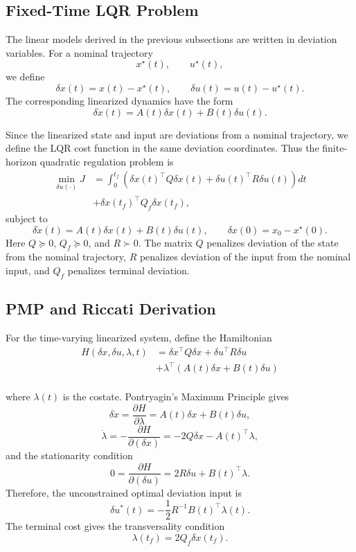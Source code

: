 
\subsection{Fixed-Time LQR Problem}

The linear models derived in the previous subsections are written in deviation variables. For a nominal trajectory
\[
    x^\star(t), \qquad u^\star(t),
\]
we define
\[
    \delta x(t)=x(t)-x^\star(t),
    \qquad
    \delta u(t)=u(t)-u^\star(t).
\]
The corresponding linearized dynamics have the form
\[
    \delta \dot x(t)
    =
    A(t)\delta x(t)+B(t)\delta u(t).
\]


Since the linearized state and input are deviations from a nominal trajectory, we define the LQR cost function in the same deviation coordinates. Thus the finite-horizon quadratic regulation problem is
\begin{align}
    \min_{\delta u(\cdot)}
    J
    &=
    \int_0^{t_f}
    \left(
        \delta x(t)^\top Q\delta x(t)
        +
        \delta u(t)^\top R\delta u(t)
    \right)dt \\ \nonumber
    &+
    \delta x(t_f)^\top Q_f \delta x(t_f),
\end{align}
subject to
\[
    \delta \dot x(t)
    =
    A(t)\delta x(t)+B(t)\delta u(t),
    \qquad
    \delta x(0)=x_0-x^\star(0).
\]
Here \(Q\succeq 0\), \(Q_f\succeq 0\), and \(R\succ 0\). The matrix \(Q\) penalizes deviation of the state from the nominal trajectory, \(R\) penalizes deviation of the input from the nominal input, and \(Q_f\) penalizes terminal deviation. 


\subsection{PMP and Riccati Derivation}

For the time-varying linearized system, define the Hamiltonian
\begin{align}
        H(\delta x,\delta u,\lambda,t)
    &=
    \delta x^\top Q\delta x
    +
    \delta u^\top R\delta u\\ \nonumber
    &+
    \lambda^\top\left(A(t)\delta x+B(t)\delta u\right)\\ \nonumber
\end{align}

where \(\lambda(t)\) is the costate. Pontryagin's Maximum Principle gives
\[
    \delta \dot x
    =
    \frac{\partial H}{\partial \lambda}
    =
    A(t)\delta x+B(t)\delta u,
\]
\[
    \dot\lambda
    =
    -\frac{\partial H}{\partial (\delta x)}
    =
    -2Q\delta x-A(t)^\top\lambda,
\]
and the stationarity condition
\[
    0
    =
    \frac{\partial H}{\partial (\delta u)}
    =
    2R\delta u+B(t)^\top\lambda.
\]
Therefore, the unconstrained optimal deviation input is
\[
    \delta u^*(t)
    =
    -\frac{1}{2}R^{-1}B(t)^\top\lambda(t).
\]
The terminal cost gives the transversality condition
\[
    \lambda(t_f)
    =
    2Q_f\delta x(t_f).
\]

